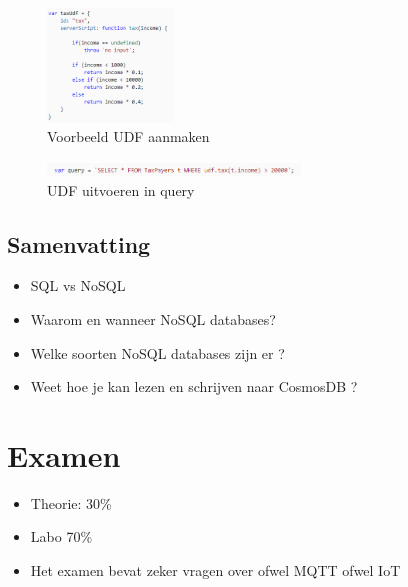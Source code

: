 \documentclass{article}
\begin{document}
\begin{figure}[H]
    \centering
    \includegraphics[width=0.3\textwidth]{udf.png}
    \caption{Voorbeeld UDF aanmaken}
\end{figure}

\begin{figure}[H]
    \centering
    \includegraphics[width=0.6\textwidth]{udf2.png}
    \caption{UDF uitvoeren in query}
\end{figure}


\subsection{Samenvatting}

\begin{itemize}
    \item SQL vs NoSQL
    \item Waarom en wanneer NoSQL databases?
    \item Welke soorten NoSQL databases zijn er ?
    \item Weet hoe je kan lezen en schrijven naar CosmosDB ?
\end{itemize}

\section{Examen}
\begin{itemize}
    \item Theorie: 30\%
    \item Labo 70\%
    \item Het examen bevat zeker vragen over ofwel MQTT ofwel IoT
\end{itemize}
\end{document}
